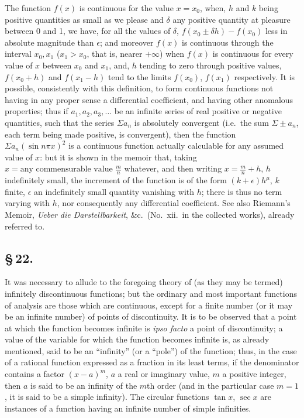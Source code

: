 \documentclass[11pt,a4paper]{book}
\begin{document}
The function $f(x)$ is continuous for the value $x = x_{0}$, when, $h$ and $k$ being positive quantities as small as we please and $\delta$ any positive quantity at pleasure between 0 and 1, we have, for all the values of $\delta$, $f(x_{0} \pm \delta h) - f(x_{0})$ less in absolute magnitude than $\epsilon$; and moreover $f(x)$ is continuous through the interval $x_{0}, x_{1}$ ($x_{1} > x_{0}$, that is, nearer $+\infty$) when $f(x)$ is continuous for every value of $x$ between $x_{0}$ and $x_{1}$, and, $h$ tending to zero through positive values, $f(x_{0} + h)$ and $f(x_{1} - h)$ tend to the limits $f(x_{0})$, $f(x_{1})$ respectively. It is possible, consistently with this definition, to form continuous functions not having in any proper sense a differential coefficient, and having other anomalous properties; thus if $a_{1}, a_{2}, a_{3}, \ldots$ be an infinite series of real positive or negative quantities, such that the series $\Sigma a_{n}$ is absolutely convergent (i.e.\ the sum $\Sigma \pm a_{n}$, each term being made positive, is convergent), then the function $\Sigma a_{n}(\sin n\pi x)^{2}$ is a continuous function actually calculable for any assumed value of $x$: but it is shown in the memoir that, taking $x = \text{any commensurable value } \frac{m}{n}$ whatever, and then writing $x = \frac{m}{n} + h$, $h$ indefinitely small, the increment of the function is of the form $(k + \epsilon)h^{\mu}$, $k$ finite, $\epsilon$ an indefinitely small quantity vanishing with $h$; there is thus no term varying with $h$, nor consequently any differential coefficient. See also Riemann's Memoir, \textit{Ueber die Darstellbarkeit}, \&c.\ (No.~xii.\ in the collected works), already referred to.

\subsection*{\S\,22.}

It was necessary to allude to the foregoing theory of (as they may be termed) infinitely discontinuous functions; but the ordinary and most important functions of analysis are those which are continuous, except for a finite number (or it may be an infinite number) of points of discontinuity. It is to be observed that a point at which the function becomes infinite is \textit{ipso facto} a point of discontinuity; a value of the variable for which the function becomes infinite is, as already mentioned, said to be an ``infinity'' (or a ``pole'') of the function; thus, in the case of a rational function expressed as a fraction in its least terms, if the denominator contains a factor $(x - a)^{m}$, $a$ a real or imaginary value, $m$ a positive integer, then $a$ is said to be an infinity of the $m$th order (and in the particular case $m = 1$, it is said to be a simple infinity). The circular functions $\tan x$, $\sec x$ are instances of a function having an infinite number of simple infinities.
\end{document}
